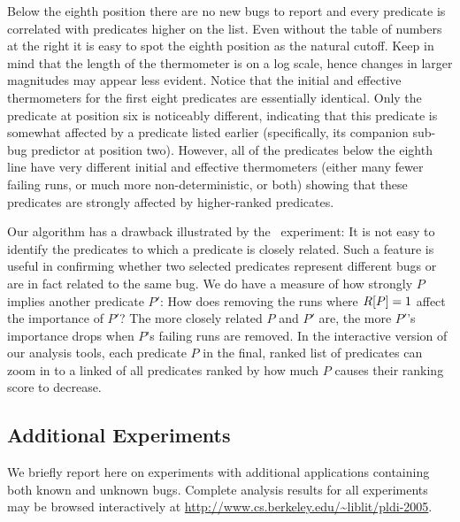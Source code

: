 Below the eighth position there are no new bugs to report and every
predicate is correlated with predicates higher on the list.  Even
without the table of numbers at the right it is easy to spot the
eighth position as the natural cutoff.  Keep in mind that the length
of the thermometer is on a log scale, hence changes in larger
magnitudes may appear less evident.  Notice that the initial and
effective thermometers for the first eight predicates are essentially
identical.  Only the predicate at position six is noticeably
different, indicating that this predicate is somewhat affected by a
predicate listed earlier (specifically, its companion sub-bug
predictor at position two).  However, all of the predicates below the
eighth line have very different initial and effective thermometers
(either many fewer failing runs, or much more non-deterministic, or
both) showing that these predicates are strongly affected by
higher-ranked predicates.

Our algorithm has a drawback illustrated by the \moss\ experiment: It
is not easy to identify the predicates to which a predicate is closely
related.  Such a feature is useful in confirming whether two selected
predicates represent different bugs or are in fact related to the same
bug.  We do have a measure of how strongly $P$ implies another
predicate $P'$: How does removing the runs where $R[P] = 1$
affect the importance of $P'$?  The more closely related $P$ and $P'$
are, the more $P'$'s importance drops when $P$'s failing runs are
removed.  In the interactive version of our analysis tools, each
predicate $P$ in the final, ranked list of predicates can zoom in to a
linked  of all predicates ranked by how much
$P$ causes their ranking score to decrease.

\subsection{Additional Experiments}

We briefly report here on experiments with additional applications
containing both known and unknown bugs.  Complete analysis results for
all experiments may be browsed interactively at
\url{http://www.cs.berkeley.edu/~liblit/pldi-2005}.

\subsubsection{\ccrypt}


